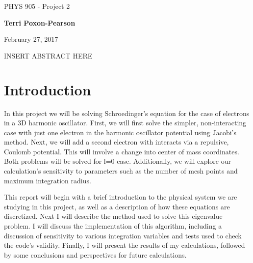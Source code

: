 \documentclass[%
oneside,                 %
final,                   %
10pt]{article}
\begin{document}

\newcommand{\exercisesection}[1]{\subsection*{#1}}






\thispagestyle{empty}

\begin{center}
{\LARGE\bf
\begin{spacing}{1.25}
PHYS 905 - Project 2
\end{spacing}
}
\end{center}


\begin{center}
{\bf Terri Poxon-Pearson}
\end{center}

    

\begin{center}
February 27, 2017
\end{center}

\vspace{1cm}

INSERT ABSTRACT HERE

\tableofcontents
 
\section{Introduction}
In this project we will be solving Schroedinger's equation for the case of electrons in a 3D harmonic oscillator. First, we will first solve the simpler, non-interacting case with just one electron in the harmonic oscillator potential using Jacobi's method. Next, we will add a second electron with interacts via a repulsive, Coulomb potential.  This will involve a change into center of mass coordinates.  Both problems will be solved for l=0 case.  Additionally, we will explore our calculation's sensitivity to parameters such as the number of mesh points and maximum integration radius.

This report will begin with a brief introduction to the physical system we are studying in this project, as well as a description of how these equations are discretized.  Next I will describe the method used to solve this eigenvalue problem.  I will discuss the implementation of this algorithm, including a discussion of sensitivity to various integration variables and tests used to check the code's validity.  Finally, I will present the results of my calculations, followed by some conclusions and perspectives for future calculations.
\end{document}
